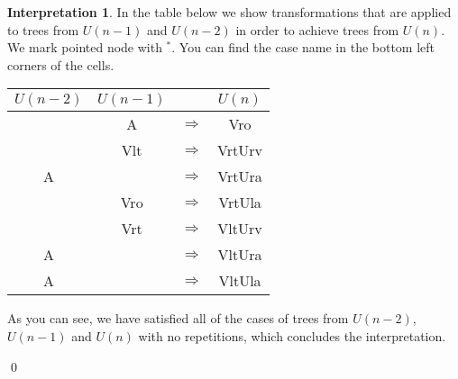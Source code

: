 \documentclass[final]{article}
\theoremstyle{definition}
\theoremstyle{definition}
\newtheorem{interpretation}{Interpretation}[subsection]
\theoremstyle{remark}
\newcommand{\pointed}[1]{\ensuremath{{#1}^*}}
\begin{document}
\begin{interpretation}
In the table below we show transformations that are applied to trees from \(U(n-1)\) and \(U(n-2)\) in order to achieve trees from \(U(n)\). We mark pointed node with \(\pointed{}\). You can find the case name in the bottom left corners of the cells.

\begin{center}
    \begin{longtable}{| c | c | c | c |}
        \hline

        \(U(n-2)\) &
        \(U(n-1)\) &
               &
        \(U(n)\)\\
        \hline

        &
        A  &
        \(\Rightarrow\)&
        Vro  \\
        \hline

        &
        Vlt  &
        \(\Rightarrow\)&
        VrtUrv  \\
        \hline

        A  &
        &
        \(\Rightarrow\)&
        VrtUra  \\
        \hline

        &
        Vro  &
        \(\Rightarrow\)&
        VrtUla  \\
        \hline

        &
        Vrt  &
        \(\Rightarrow\)&
        VltUrv  \\
        \hline

        A  &
        &
        \(\Rightarrow\)&
        VltUra  \\
        \hline

        A  &
        &
        \(\Rightarrow\)&
        VltUla  \\
        \hline
    \end{longtable}
\end{center}


As you can see, we have satisfied all of the cases of trees from \(U(n-2)\), \(U(n-1)\) and \(U(n)\) with no repetitions, which concludes the interpretation.

\qed%
\end{interpretation}
\end{document}
